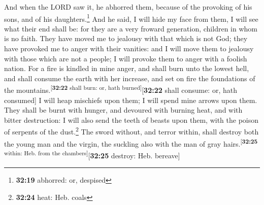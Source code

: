  And when the LORD saw it, he abhorred them, because of
the provoking of his sons, and of his daughters.\footnote{\textbf{32:19}
  abhorred: or, despised}  And he said, I will hide my
face from them, I will see what their end shall be: for they are a very
froward generation, children in whom is no faith.  They
have moved me to jealousy with that which is not God; they have provoked
me to anger with their vanities: and I will move them to jealousy with
those which are not a people; I will provoke them to anger with a
foolish nation.  For a fire is kindled in mine anger, and
shall burn unto the lowest hell, and shall consume the earth with her
increase, and set on fire the foundations of the
mountains.\textsuperscript{{[}\textbf{32:22} shall burn: or, hath
burned{]}}{[}\textbf{32:22} shall consume: or, hath consumed{]}
 I will heap mischiefs upon them; I will spend mine
arrows upon them.  They shall be burnt with hunger, and
devoured with burning heat, and with bitter destruction: I will also
send the teeth of beasts upon them, with the poison of serpents of the
dust.\footnote{\textbf{32:24} heat: Heb. coals}  The
sword without, and terror within, shall destroy both the young man and
the virgin, the suckling also with the man of gray
hairs.\textsuperscript{{[}\textbf{32:25} within: Heb. from the
chambers{]}}{[}\textbf{32:25} destroy: Heb. bereave{]}

